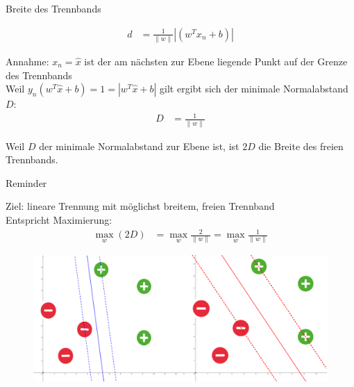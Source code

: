 \documentclass[ngerman]{beamer}
\newcommand{\norm}[1]{\lVert#1\rVert}
\begin{document}
\begin{frame}{Breite des Trennbands}
	
	\begin{equation*}
		\begin{aligned}
			d &= \frac{1}{\norm{w}} | (w^{T} x_{n} + b) |
		\end{aligned}
	\end{equation*}

	Annahme: $x_{n} = \hat{x}$ ist der am nächsten zur Ebene liegende Punkt auf der Grenze des Trennbands\\
	Weil $y_{n} (w^{T} \hat{x} + b) = 1 = |w^{T} \hat{x} + b|$ gilt ergibt sich der minimale Normalabstand $D$: \\
	
	\begin{equation*}
		\begin{aligned}
			D &= \frac{1}{\norm{w}}
		\end{aligned}
	\end{equation*}

	 Weil $D$ der minimale Normalabstand zur Ebene ist, ist $2D$ die Breite des freien Trennbands.

\end{frame}


\begin{frame}{Reminder}
	
	Ziel: lineare Trennung mit möglichst breitem, freien Trennband \\
	
	Entspricht Maximierung:
	\begin{equation*}
		\begin{aligned}
			\max_{w} (2 D) &= \max_{w} \frac{2}{\norm{w}} = \max_{w} \frac{1}{\norm{w}}
		\end{aligned}
	\end{equation*}
	
	\begin{center}
		\begin{figure}
			\includegraphics[width=\textwidth,height=0.7\textheight,keepaspectratio]{assets/small_vs_big_margin.png}
		\end{figure}
	\end{center}	
\end{frame}
\end{document}
